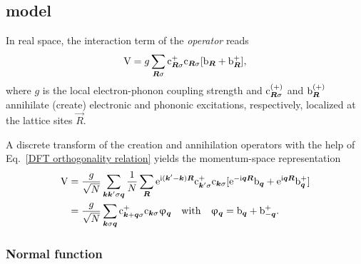 \subsection{ model}
\label{Holstein model}

In real space, the interaction term of the \emph{
operator} reads
%
\begin{equation*}
    \mathrm V = g \sum_{\boldsymbol R \sigma}
    \mathrm c_{\boldsymbol R \sigma}^+ \mathrm c_{\boldsymbol R \sigma}
    [\mathrm b_{\boldsymbol R} + \mathrm b_{\boldsymbol R}^+],
\end{equation*}
%
where $g$ is the local electron-phonon coupling strength and $\mathrm c_{\boldsymbol R
\sigma}^{(+)}$ and $\mathrm b_{\boldsymbol R}^{(+)}$ annihilate (create) electronic and
phononic excitations, respectively, localized at the lattice sites $\vec R$.

A discrete  transform of the creation and annihilation operators
with the help of Eq.~\ref{DFT orthogonality relation} yields the momentum-space
representation
%
\begin{align*}
    \mathrm V &= \frac g {\sqrt N} \sum_{\boldsymbol k \boldsymbol k' \sigma \boldsymbol q}
    \frac 1 N \sum_{\boldsymbol R} \mathrm e^{\mathrm i (\boldsymbol k' - \boldsymbol k) \boldsymbol R}
    \mathrm c_{\boldsymbol k' \sigma}^+ \mathrm c_{\boldsymbol k \sigma} [
        \mathrm e^{-\mathrm i \boldsymbol q \boldsymbol R} \mathrm b_{\boldsymbol q} +
        \mathrm e^{\mathrm i \boldsymbol q \boldsymbol R} \mathrm b_{\boldsymbol q}^+
    ] \\ &= \frac g {\sqrt N} \sum_{\boldsymbol k \sigma \boldsymbol q}
    \mathrm c_{\boldsymbol k + \boldsymbol q \sigma}^+ \mathrm c_{\boldsymbol k \sigma}
    \upvarphi_{\boldsymbol q}
    \quad \text{with} \quad
    \upvarphi_{\boldsymbol q} = \mathrm b_{\boldsymbol q} + \mathrm b_{-\boldsymbol q}^+.
\end{align*}

\subsubsection{Normal  function}

